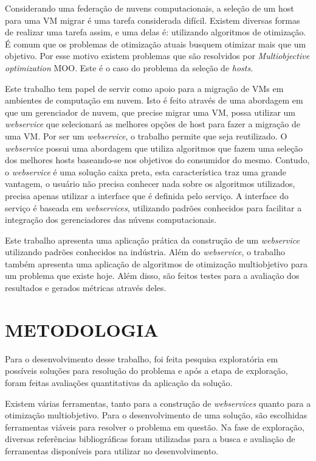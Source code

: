 Considerando uma federação de nuvens computacionais, a seleção de um host para uma VM migrar é
uma tarefa considerada difícil. Existem diversas formas de realizar uma tarefa assim, e uma delas é:
utilizando algoritmos de otimização. É comum que os problemas de otimização atuais busquem otimizar
mais que um objetivo. Por esse motivo existem problemas que são resolvidos por \textit{Multiobjective
optimization} MOO. Este é o caso do problema da seleção de \textit{hosts}.

Este trabalho tem papel de servir como apoio para a migração de VMs em ambientes de computação em nuvem. 
Isto é feito através de uma abordagem em que um gerenciador de nuvem, que precise migrar uma VM, possa 
utilizar um \textit{webservice} que selecionará as melhores opções de host para fazer a migração de uma VM. 
Por ser um \textit{webservice}, o trabalho permite que seja reutilizado. O \textit{webservice} possui uma abordagem que 
utiliza algoritmos que fazem uma seleção dos melhores hosts baseando-se 
nos objetivos do consumidor do mesmo. Contudo, o \textit{webservice} é uma solução caixa preta, esta característica 
traz uma grande vantagem, o usuário não precisa conhecer nada sobre os algoritmos utilizados, 
precisa apenas utilizar a interface que é definida pelo serviço. A interface do serviço é baseada em
\textit{webservices}, utilizando padrões conhecidos para facilitar a integração dos gerenciadores
das núvens computacionais.

Este trabalho apresenta uma aplicação prática da construção de um \textit{webservice} utilizando padrões conhecidos
na indústria. Além do \textit{webservice}, o trabalho também apresenta uma aplicação de algoritmos de otimização multiobjetivo
para um problema que existe hoje. Além disso, são feitos testes para a avaliação dos resultados e gerados métricas através deles.

\section{METODOLOGIA}

Para o desenvolvimento desse trabalho, foi feita pesquisa exploratória em possíveis
soluções para resolução do problema e após a etapa de exploração, foram feitas
avaliações quantitativas da aplicação da solução.

Existem várias ferramentas, tanto para a construção de \textit{webservices} quanto
para a otimização multiobjetivo. Para o desenvolvimento de uma solução, 
são escolhidas ferramentas viáveis para resolver o problema em questão.
Na fase de exploração, diversas referências bibliográficas foram utilizadas para 
a busca e avaliação de ferramentas disponíveis para utilizar no desenvolvimento. 

